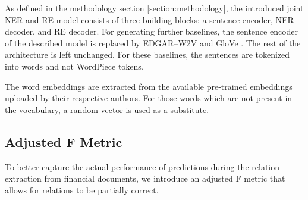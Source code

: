 \documentclass[conference, table]{IEEEtran}
\newcommand{\1} {\mathbbm{1}}
\begin{document}
As defined in the methodology section \ref{section:methodology}, the introduced joint NER and RE model consists of three building blocks: a sentence encoder, NER decoder, and RE decoder. For generating further baselines, the sentence encoder of the described model is replaced by EDGAR--W2V \cite{loukas2021edgar} and GloVe \cite{pennington2014glove}.
The rest of the architecture is left unchanged. For these baselines, the sentences are tokenized into words and not WordPiece tokens. 


The word embeddings are extracted from the available pre-trained embeddings uploaded by their respective authors. For those words which are not present in the vocabulary, a random vector is used as a substitute. 

\subsection{Adjusted F Metric}
\label{subsection:adjustedf1}

To better capture the actual performance of predictions during the relation extraction from financial documents, we introduce an adjusted F metric that allows for relations to be partially correct.
\end{document}
